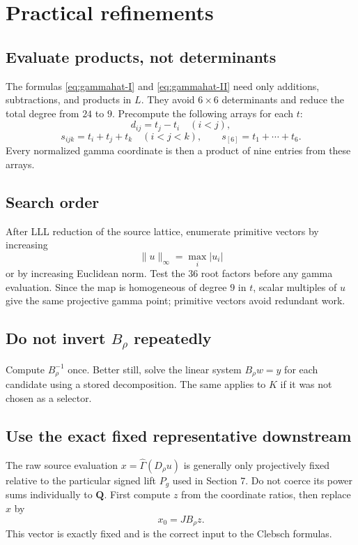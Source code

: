 \documentclass[11pt]{article}
\newcommand{\QQ}{\mathbf{Q}}
\newcommand{\Gamhat}{\widehat{\Gamma}}
\begin{document}
\section{Practical refinements}

\subsection{Evaluate products, not determinants}

The formulas \eqref{eq:gammahat-I} and \eqref{eq:gammahat-II} need only additions,
subtractions, and products in $L$.  They avoid $6\times6$ determinants and reduce
the total degree from $24$ to $9$.  Precompute the following arrays for each $t$:
\[
  d_{ij}=t_j-t_i\quad(i<j),
\]
\[
  s_{ijk}=t_i+t_j+t_k\quad(i<j<k),
  \qquad s_{[6]}=t_1+\cdots+t_6.
\]
Every normalized gamma coordinate is then a product of nine entries from these
arrays.

\subsection{Search order}

After LLL reduction of the source lattice, enumerate primitive vectors by increasing
\[
  \|u\|_\infty=\max_i|u_i|
\]
or by increasing Euclidean norm.  Test the $36$ root factors before any gamma
evaluation.  Since the map is homogeneous of degree $9$ in $t$, scalar multiples of
$u$ give the same projective gamma point; primitive vectors avoid redundant work.

\subsection{Do not invert $B_\rho$ repeatedly}

Compute $B_\rho^{-1}$ once.  Better still, solve the linear system
$B_\rho w=y$ for each candidate using a stored decomposition.  The same applies to
$K$ if it was not chosen as a selector.

\subsection{Use the exact fixed representative downstream}

The raw source evaluation $x=\Gamhat(D_\rho u)$ is generally only projectively
fixed relative to the particular signed lift $P_g$ used in Section 7.  Do not coerce
its power sums individually to $\QQ$.  First compute $z$ from the coordinate ratios,
then replace $x$ by
\[
  x_0=JB_\rho z.
\]
This vector is exactly fixed and is the correct input to the Clebsch formulas.
\end{document}
